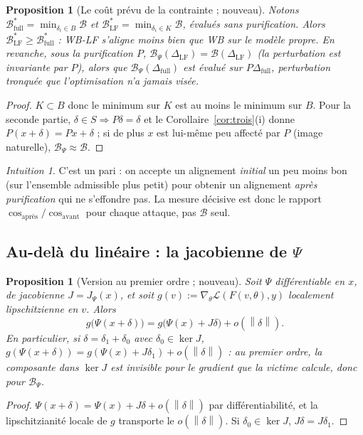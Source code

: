 \documentclass[11pt,a4paper]{article}
\theoremstyle{plain}
\newtheorem{proposition}[theorem]{Proposition}
\theoremstyle{definition}
\theoremstyle{remark}
\newtheorem{intuition}[theorem]{Intuition}
\newcommand{\Loss}{\mathcal{L}}
\newcommand{\B}{\mathcal{B}}
\newcommand{\norm}[1]{\left\lVert #1 \right\rVert}
\newcommand{\grad}{\nabla}
\DeclareMathOperator{\cosang}{cos}
\begin{document}
\begin{proposition}[Le coût prévu de la contrainte ; nouveau]\label{prop:cost}
Notons $\B^*_{\mathrm{full}}=\min_{\delta_i\in B}\B$ et $\B^*_{\mathrm{LF}}=\min_{\delta_i\in K}\B$,
évalués \emph{sans} purification. Alors $\B^*_{\mathrm{LF}}\ge\B^*_{\mathrm{full}}$ : WB-LF
s'aligne moins bien que WB sur le modèle propre. En revanche, sous la purification $P$,
$\B_\Psi(\Delta_{\mathrm{LF}})=\B(\Delta_{\mathrm{LF}})$ (la perturbation est invariante par $P$),
alors que $\B_\Psi(\Delta_{\mathrm{full}})$ est évalué sur $P\Delta_{\mathrm{full}}$, perturbation
tronquée que l'optimisation n'a jamais visée.
\end{proposition}
\begin{proof}
$K\subset B$ donc le minimum sur $K$ est au moins le minimum sur $B$. Pour la seconde partie,
$\delta\in S\Rightarrow P\delta=\delta$ et le Corollaire~\ref{cor:trois}(i) donne $P(x+\delta)=Px+\delta$ ;
si de plus $x$ est lui-même peu affecté par $P$ (image naturelle), $\B_\Psi\approx\B$.
\end{proof}

\begin{intuition}
C'est un pari : on accepte un alignement \emph{initial} un peu moins bon (sur l'ensemble
admissible plus petit) pour obtenir un alignement \emph{après purification} qui ne s'effondre pas.
La mesure décisive est donc le rapport $\cosang_{\text{après}}/\cosang_{\text{avant}}$ pour chaque
attaque, pas $\B$ seul.
\end{intuition}

\subsection{Au-delà du linéaire : la jacobienne de \texorpdfstring{$\Psi$}{Psi}}

\begin{proposition}[Version au premier ordre ; nouveau]\label{prop:jac}
Soit $\Psi$ différentiable en $x$, de jacobienne $J=J_\Psi(x)$, et soit
$g(v):=\grad_\theta\Loss(F(v,\theta),y)$ localement lipschitzienne en $v$. Alors
\[
g\big(\Psi(x+\delta)\big)=g\big(\Psi(x)+J\delta\big)+o(\norm\delta).
\]
En particulier, si $\delta=\delta_1+\delta_0$ avec $\delta_0\in\ker J$,
$g(\Psi(x+\delta))=g(\Psi(x)+J\delta_1)+o(\norm\delta)$ : au premier ordre, la composante dans
$\ker J$ est invisible pour le gradient que la victime calcule, donc pour $\B_\Psi$.
\end{proposition}
\begin{proof}
$\Psi(x+\delta)=\Psi(x)+J\delta+o(\norm\delta)$ par différentiabilité, et la lipschitzianité locale
de $g$ transporte le $o(\norm\delta)$. Si $\delta_0\in\ker J$, $J\delta=J\delta_1$.
\end{proof}
\end{document}
